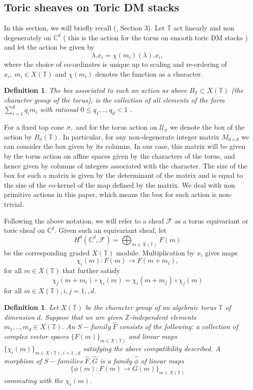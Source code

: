 \documentclass[10pt]{amsart}
\newtheorem{defn}[prop]{Definition}
\numberwithin{equation}{subsection}
\begin{document}
\subsection{Toric sheaves on Toric DM stacks}
In this section, we will briefly recall (\cite{GJK}, Section 3). Let $\mathbb{T}$ act linearly and non degenerately on $\mathbb{C}^d$ ( this is the action for the torus on smooth toric DM stacks ) and let the action be given by $$\lambda.x_i=\chi(m_i)(\lambda).x_i,$$ where the choice of co-ordinates is unique up to scaling and re-ordering of $x_i,\ m_i\in X(\mathbb{T})$ and $\chi(m_i)$ denotes the function as a character.
\begin{defn}
The box associated to such an action as above $B_{\mathbb{T}}\subset X(\mathbb{T})$ (the character group of the torus), is the collection of all elements of the form $\sum_{i=1}^{d}q_im_i$ with rational $0\leq q_1,..,q_d<1$ \label{Box}.    
\end{defn}
For a fixed top cone $\sigma,$ and for the torus action on $\mathscr{U}_{\sigma}$ we denote the box of the action by $B_{\sigma}(\mathbb{T}).$  In particular, for any non-degenerate integer matrix $M_{d\times d}$ we can consider the box given by its columns. In our case, this matrix will be given by the torus action on affine spaces given by the characters of the torus, and hence given by columns of integers associated with the character. The size of the box for such a matrix is given by the determinant of the matrix and is equal to the size of the co-kernel of the map defined by the matrix. We deal with non primitive actions in this paper, which means the box for such action is non-trivial. \par 
Following the above notation, we will refer to a sheaf $\mathscr{F}$ as a torus equivariant or toric sheaf on $\mathbb{C}^d.$ Given such an equivariant sheaf, let
$$H^{0}(\mathbb{C}^d,\mathscr{F})=\bigoplus_{m\in X(\mathbb{T})}F(m)$$ be the corresponding graded $X(\mathbb{T})$ module. Multiplication by $x_i$ gives maps
$$\chi_i(m):F(m)\to F(m+m_i),$$ for all $m\in X(\mathbb{T})$ that further satisfy
$$\chi_{j}(m+m_i)\circ\chi_{i}(m)=\chi_{i}(m+m_j)\circ\chi_{j}(m)$$ for all $m\in X(\mathbb{T}),i,j=1,,d.$
\begin{defn}
Let $X(\mathbb{T})$ be the character group of an algebraic torus $\mathbb{T}$ of dimension $d.$ Suppose that we are given $\mathbb{Z}$-independent elements $m_1,..,m_d \in X(\mathbb{T}).$ An $S- family\ \hat{F}$ consists of the following: a collection of complex vector spaces $\{F(m)\}_{m\in X(\mathbb{T})}$ and linear maps $\{\chi_i(m)\}_{m\in X(\mathbb{T}),i=1,,d}$ satisfying the above compatibility described.
A morphism of $S-families\ \hat{F},\hat{G}$ is a family $\hat{\phi}$ of linear maps
$$\{\phi(m):F(m)\to G(m)\}_{m\in X(\mathbb{T})}$$ commuting with the $\chi_{i}(m).$
\end{defn}
\end{document}
